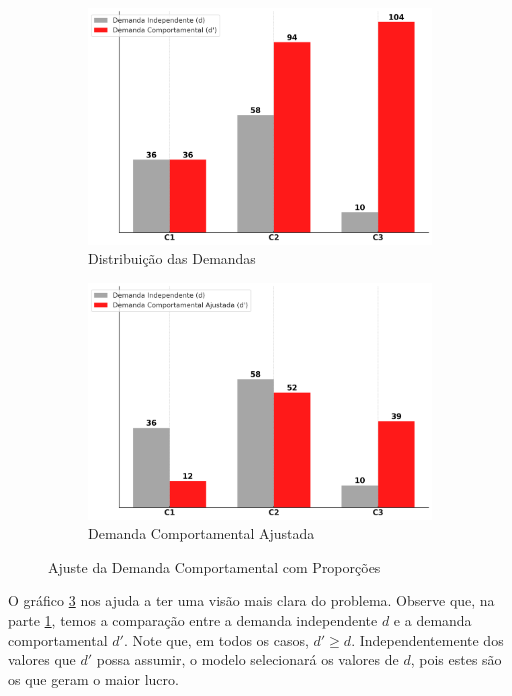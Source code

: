 \begin{figure}[H]
	\centering
	\begin{subfigure}[b]{0.45\linewidth}
		\includegraphics[width=\linewidth]{img/dem_classes.png}
		\caption{Distribuição das Demandas}
		\label{fig:dem_classes_propor}
	\end{subfigure}\hspace{5mm}
	\begin{subfigure}[b]{0.45\linewidth}
		\includegraphics[width=\linewidth]{img/dem_redistri.png}
		\caption{Demanda Comportamental Ajustada}
		\label{fig:dem_redistri}
	\end{subfigure}
	\caption{Ajuste da Demanda Comportamental com Proporções}
	\label{fig: ajustes_demanda}
\end{figure}

O gráfico \ref{fig: ajustes_demanda} nos ajuda a ter uma visão mais clara do problema. Observe que, na parte \ref{fig:dem_classes_propor}, temos a comparação entre a demanda independente $d$ e a demanda comportamental $d'$. Note que, em todos os casos, $d' \geq d$. Independentemente dos valores que $d'$ possa assumir, o modelo selecionará os valores de $d$, pois estes são os que geram o maior lucro.


